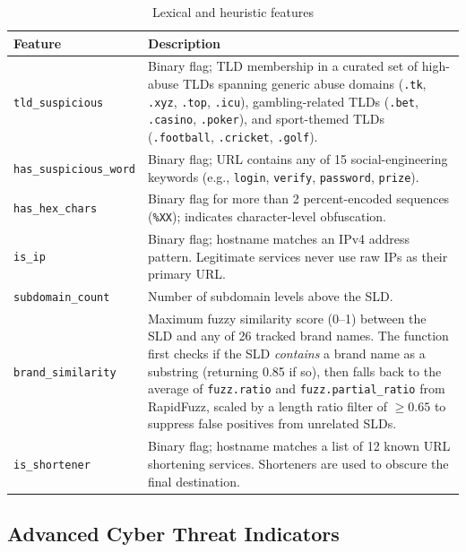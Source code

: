\documentclass[12pt,a4paper]{article}
\begin{document}
\begin{table}[H]
    \centering
    \begin{tabularx}{\textwidth}{l >{\raggedright\arraybackslash}X}
        \toprule
        \textbf{Feature} & \textbf{Description} \\
        \midrule
        \texttt{tld\_suspicious}        & Binary flag; TLD membership in a curated set of high-abuse TLDs spanning generic abuse domains (\texttt{.tk}, \texttt{.xyz}, \texttt{.top}, \texttt{.icu}), gambling-related TLDs (\texttt{.bet}, \texttt{.casino}, \texttt{.poker}), and sport-themed TLDs (\texttt{.football}, \texttt{.cricket}, \texttt{.golf}). \\
        \addlinespace[4pt]
        \texttt{has\_suspicious\_word}  & Binary flag; URL contains any of 15 social-engineering keywords (e.g., \texttt{login}, \texttt{verify}, \texttt{password}, \texttt{prize}). \\
        \addlinespace[4pt]
        \texttt{has\_hex\_chars}        & Binary flag for more than 2 percent-encoded sequences (\texttt{\%XX}); indicates character-level obfuscation. \\
        \addlinespace[4pt]
        \texttt{is\_ip}                 & Binary flag; hostname matches an IPv4 address pattern. Legitimate services never use raw IPs as their primary URL. \\
        \addlinespace[4pt]
        \texttt{subdomain\_count}       & Number of subdomain levels above the SLD. \\
        \addlinespace[4pt]
        \texttt{brand\_similarity}      & Maximum fuzzy similarity score (0--1) between the SLD and any of 26 tracked brand names. The function first checks if the SLD \textit{contains} a brand name as a substring (returning 0.85 if so), then falls back to the average of \texttt{fuzz.ratio} and \texttt{fuzz.partial\_ratio} from RapidFuzz, scaled by a length ratio filter of $\geq 0.65$ to suppress false positives from unrelated SLDs. \\
        \addlinespace[4pt]
        \texttt{is\_shortener}          & Binary flag; hostname matches a list of 12 known URL shortening services. Shorteners are used to obscure the final destination. \\
        \bottomrule
    \end{tabularx}
    \caption{Lexical and heuristic features}
    \label{tab:feat_lexical}
\end{table}

\subsection{Advanced Cyber Threat Indicators}
\end{document}
